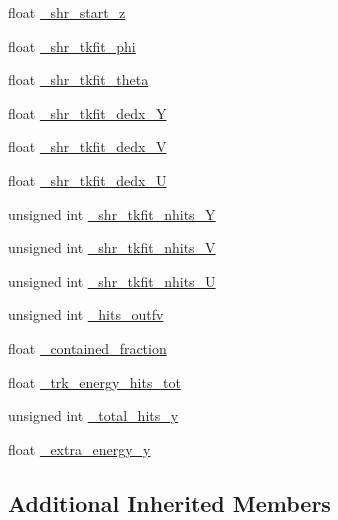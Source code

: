 \begin{DoxyCompactItemize}
float \hyperlink{classselection_1_1CC0piNpSelection_a6e8b4637c8de2991e4d48291d3e90ddf}{\-\_\-shr\-\_\-start\-\_\-z}
\item 
float \hyperlink{classselection_1_1CC0piNpSelection_aefb0bc61c417330a448ababb5363ad8f}{\-\_\-shr\-\_\-tkfit\-\_\-phi}
\item 
float \hyperlink{classselection_1_1CC0piNpSelection_a11df391e482434665c389423bbb9ec5d}{\-\_\-shr\-\_\-tkfit\-\_\-theta}
\item 
float \hyperlink{classselection_1_1CC0piNpSelection_ababbbc32babdef645c2edc613713ceb7}{\-\_\-shr\-\_\-tkfit\-\_\-dedx\-\_\-\-Y}
\item 
float \hyperlink{classselection_1_1CC0piNpSelection_a428fc549513bea0e1ca92cf90c1148cd}{\-\_\-shr\-\_\-tkfit\-\_\-dedx\-\_\-\-V}
\item 
float \hyperlink{classselection_1_1CC0piNpSelection_aaaef69409457695e2300bf847a13804c}{\-\_\-shr\-\_\-tkfit\-\_\-dedx\-\_\-\-U}
\item 
unsigned int \hyperlink{classselection_1_1CC0piNpSelection_ae3a53326b19594013c9df08b66ccaa73}{\-\_\-shr\-\_\-tkfit\-\_\-nhits\-\_\-\-Y}
\item 
unsigned int \hyperlink{classselection_1_1CC0piNpSelection_adab23c54dd799cdf83c31a10e4ae9061}{\-\_\-shr\-\_\-tkfit\-\_\-nhits\-\_\-\-V}
\item 
unsigned int \hyperlink{classselection_1_1CC0piNpSelection_a6c75f5783174133ce97849f128f3dee3}{\-\_\-shr\-\_\-tkfit\-\_\-nhits\-\_\-\-U}
\item 
unsigned int \hyperlink{classselection_1_1CC0piNpSelection_ac39ec79d190fb925f8d20b03cbeb0605}{\-\_\-hits\-\_\-outfv}
\item 
float \hyperlink{classselection_1_1CC0piNpSelection_a8e7933222bce1424aee24bae8dcf4864}{\-\_\-contained\-\_\-fraction}
\item 
float \hyperlink{classselection_1_1CC0piNpSelection_a82a48c6128c34252642d237b98f1b66a}{\-\_\-trk\-\_\-energy\-\_\-hits\-\_\-tot}
\item 
unsigned int \hyperlink{classselection_1_1CC0piNpSelection_a819d1d973e74bcd2ad82aa01ea24ac37}{\-\_\-total\-\_\-hits\-\_\-y}
\item 
float \hyperlink{classselection_1_1CC0piNpSelection_a2e386c361ecc27d22ff2642e80a629e4}{\-\_\-extra\-\_\-energy\-\_\-y}
\end{DoxyCompactItemize}
\subsection*{Additional Inherited Members}



